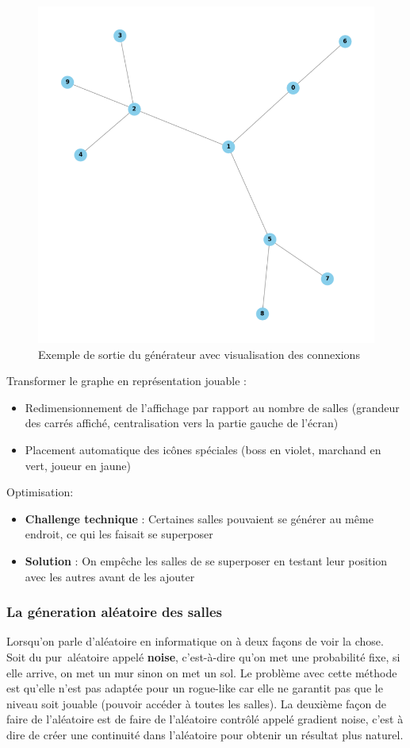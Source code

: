 \documentclass[a4paper,11pt]{article}
\begin{document}
\begin{figure}[ht]
\centering
\includegraphics[width=0.4\linewidth]{./img/map_generation.png}
\caption{Exemple de sortie du générateur avec visualisation des connexions}
\label{fig:map_gen32}
\end{figure}
\bigskip
Transformer le graphe en représentation jouable :
\begin{itemize}
    \item Redimensionnement de l'affichage par rapport  au nombre de salles (grandeur des carrés affiché, centralisation vers la partie gauche de l'écran)
    \item  Placement automatique des icônes spéciales (boss en violet, marchand en vert, joueur en jaune)
\end{itemize}
\bigskip
Optimisation:
\begin{itemize}
\item \textbf{Challenge technique} : Certaines salles pouvaient se générer au même endroit, ce qui les faisait se superposer
\item \textbf{Solution} : On empêche les salles de se superposer en testant leur position avec les autres avant de les ajouter
\end{itemize}


\subsubsection{La géneration aléatoire des salles}
Lorsqu'on parle d'aléatoire en informatique on à deux façons de voir la chose. Soit du \guillemotleft pur\guillemotright \ aléatoire appelé \textbf{noise}, c'est-à-dire qu'on met une probabilité fixe, si elle arrive, on met un mur sinon on met un sol. Le problème avec cette méthode est qu'elle n'est pas adaptée pour un rogue-like car elle ne garantit pas que le niveau soit jouable (pouvoir accéder à toutes les salles). 
La deuxième façon de faire de l'aléatoire est de faire de l'aléatoire contrôlé appelé gradient noise, c'est à dire de créer une continuité dans l'aléatoire pour obtenir un résultat plus naturel.\\\\
\end{document}
